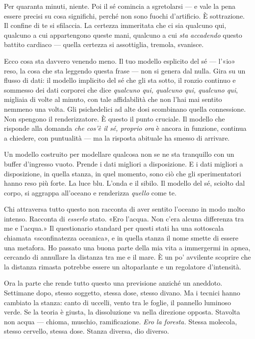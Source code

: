 \documentclass[11pt, twoside, openright]{book}
\begin{document}
Per quaranta minuti, niente. Poi il sé comincia a sgretolarsi --- e vale la pena essere precisi su cosa significhi, perché non sono fuochi d'artificio. È sottrazione. Il confine di te si sfilaccia. La certezza immeritata che ci sia qualcuno qui, qualcuno a cui appartengono queste mani, qualcuno a cui \textit{sta accadendo} questo battito cardiaco --- quella certezza si assottiglia, tremola, svanisce.

Ecco cosa sta davvero venendo meno. Il tuo modello esplicito del sé --- l'«io» reso, la cosa che sta leggendo questa frase --- non si genera dal nulla. Gira su un flusso di dati: il modello implicito del sé che gli sta sotto, il ronzio continuo e sommesso dei dati corporei che dice \textit{qualcuno qui, qualcuno qui, qualcuno qui}, migliaia di volte al minuto, con tale affidabilità che non l'hai mai sentito nemmeno una volta. Gli psichedelici ad alte dosi scombinano quella connessione. Non spengono il renderizzatore. È questo il punto cruciale. Il modello che risponde alla domanda \textit{che cos'è il sé, proprio ora} è ancora in funzione, continua a chiedere, con puntualità --- ma la risposta abituale ha smesso di arrivare.

Un modello costruito per modellare qualcosa non se ne sta tranquillo con un buffer d'ingresso vuoto. Prende i dati migliori a disposizione. E i dati migliori a disposizione, in quella stanza, in quel momento, sono ciò che gli sperimentatori hanno reso più forte. La luce blu. L'onda e il sibilo. Il modello del sé, sciolto dal corpo, si aggrappa all'oceano e renderizza \textit{quello} come te.

Chi attraversa tutto questo non racconta di aver sentito l'oceano in modo molto intenso. Racconta di \textit{esserlo} stato. «Ero l'acqua. Non c'era alcuna differenza tra me e l'acqua.» Il questionario standard per questi stati ha una sottoscala chiamata «sconfinatezza oceanica», e in quella stanza il nome smette di essere una metafora. Ho passato una buona parte della mia vita a immergermi in apnea, cercando di annullare la distanza tra me e il mare. È un po' avvilente scoprire che la distanza rimasta potrebbe essere un altoparlante e un regolatore d'intensità.

Ora la parte che rende tutto questo una previsione anziché un aneddoto. Settimane dopo, stesso soggetto, stessa dose, stesso divano. Ma i tecnici hanno cambiato la stanza: canto di uccelli, vento tra le foglie, il pannello luminoso verde. Se la teoria è giusta, la dissoluzione va nella direzione opposta. Stavolta non acqua --- chioma, muschio, ramificazione. \textit{Ero la foresta.} Stessa molecola, stesso cervello, stessa dose. Stanza diversa, dio diverso.
\end{document}
